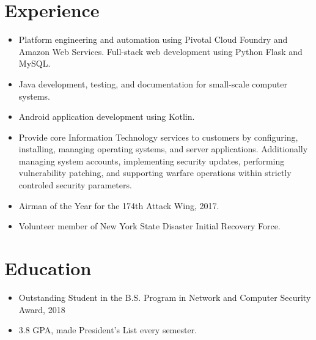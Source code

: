 \documentclass[11pt]{resume}
\author{Seth P. Sevier}
\begin{document}
\maketitle
\smallskip

\section{Experience}
\begin{itemize}
\item Platform engineering and automation using Pivotal Cloud Foundry and Amazon Web Services.  Full-stack web development using Python Flask and MySQL.
\item Java development, testing, and documentation for small-scale computer systems.
\item Android application development using Kotlin.
\end{itemize}

\begin{itemize}
\item Provide core Information Technology services to customers by configuring, installing, managing operating systems, and server applications.  Additionally managing system accounts, implementing security updates, performing vulnerability patching, and supporting warfare operations within strictly controled security parameters.
\item Airman of the Year for the 174th Attack Wing, 2017.
\item Volunteer member of New York State Disaster Initial Recovery Force.
\end{itemize}

\section{Education}
\begin{itemize}
\item Outstanding Student in the B.S. Program in Network and Computer Security Award, 2018
\item 3.8 GPA, made President's List every semester.
\end{itemize}
\end{document}
